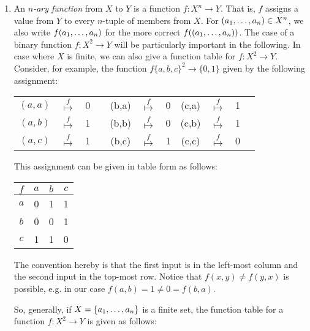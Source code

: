 \begin{enumerate}[\thesection.1]
\item An \emph{$n$-ary function} from $X$ to $Y$ is a function $f:X^n\to Y$. That is, $f$ assigns a value from $Y$ to every $n$-tuple of members from $X$. For $(a_1, \mathellipsis, a_n)\in X^n$, we also write $f(a_1, \mathellipsis, a_n)$ for the more correct $f((a_1, \mathellipsis, a_n))$. The case of a binary function $f:X^2\to Y$ will be particularly important in the following. In case where $X$ is finite, we can also give a function table for $f:X^2\to Y$. Consider, for example, the function $f\{a,b,c\}^2\to \{0,1\}$ given by the following assignment:
\begin{center}
	\begin{tabular}{c c c c c c c c c c c}
	$(a,a)$ & $\overset{f}{\mapsto}$ & 0 & \quad & (b,a) & $\overset{f}{\mapsto}$ & 0  \quad & (c,a) & $\overset{f}{\mapsto}$ & 1\\

	$(a,b)$ & $\overset{f}{\mapsto}$ & 1 & \quad & (b,b) & $\overset{f}{\mapsto}$ & 0  \quad & (c,b) & $\overset{f}{\mapsto}$ & 1\\


	$(a,c)$ & $\overset{f}{\mapsto}$ & 1 & \quad & (b,c) & $\overset{f}{\mapsto}$ & 1  \quad & (c,c) & $\overset{f}{\mapsto}$ & 0\\


	\end{tabular}
\end{center}

This assignment can be given in table form as follows:

\begin{center}
	\begin{tabular}{ c | c c c}
	$f$ & $a$ & $b$ & $c$ \\ \hline
	
	$a$ & 0 & 1 & 1\\
	
	$b$ & 0 & 0 & 1\\
	
	$c$ & 1 & 1 & 0
	
	\end{tabular} 
	
\end{center}

The convention hereby is that the first input is in the left-most column and the second input in the top-most row. Notice that $f(x,y)\neq f(y,x)$ is possible, e.g. in our case $f(a,b)=1\neq 0=f(b,a)$.

So, generally, if $X=\{a_1, \mathellipsis, a_n\}$ is a finite set, the function table for a function $f:X^2\to Y$ is given as follows:


\end{enumerate}
